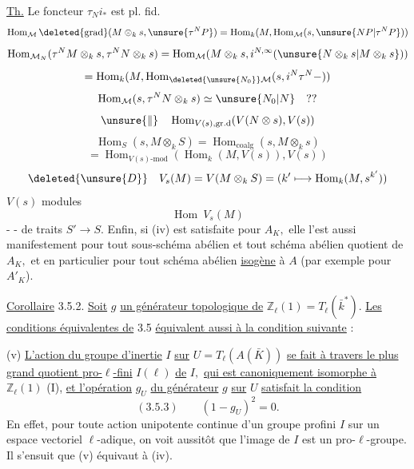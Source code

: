 \uline{Th.} Le foncteur \(\tau_N i_*\) est pl. fid.
\[
\operatorname{Hom}_{\mathcal M}\deleted{\text{grad}}(M\otimes_k s,\unsure{\tau^N P})=
\operatorname{Hom}_k(M,\operatorname{Hom}_{\mathcal M}(s,\unsure{NP|\tau^N P}))
\]
\[
\operatorname{Hom}_{\mathcal M_N}(\tau^N M\otimes_k s,\tau^N N\otimes_k s)=
\operatorname{Hom}_{\mathcal M}(M\otimes_k s,i^{N,\infty}(\unsure{N\otimes_k s|M\otimes_k s}))
\]
\[
=\operatorname{Hom}_k(M,\operatorname{Hom}_{\deleted{\unsure{N_0}}\mathcal M}(s,i^{N}\tau^N-))
\]
\[
\operatorname{Hom}_{\mathcal M}(s,\tau^N N\otimes_k s)\simeq\unsure{N_0|N}\quad??
\]
\[
\unsure{\Vert}\quad\operatorname{Hom}_{V(s),\mathrm{gr.d}}(V(N\otimes s),V(s))
\]
\[
\operatorname{Hom}_S(s,M\otimes_k S)=
\operatorname{Hom}_{\mathrm{coalg}}(s,M\otimes_k s)
\]
\[
=\operatorname{Hom}_{V(s)\text{-mod}}(\operatorname{Hom}_k(M,V(s)),V(s))
\]
\[
\deleted{\unsure{D}}\quad V_s(M)=V(M\otimes_k S)
=(k'\longmapsto\operatorname{Hom}_k(M,s^{k'}))
\]
\(V(s)\) modules
\[
\operatorname{Hom}\ V_s(M)
\]
-  -
de traits \(S'\longrightarrow S.\) Enfin, si (iv) est satisfaite pour \(A_K,\) elle l'est aussi manifestement pour tout sous-schéma abélien et tout schéma abélien quotient de \(A_K,\) et en particulier pour tout schéma abélien \uline{isogène} à \(A\) (par exemple pour \(A'_K\)).

\uline{Corollaire} 3.5.2. \uline{Soit} \(g\) \uline{un générateur topologique de} \(\mathbb Z_\ell(1)=T_\ell(\bar k^*).\) \uline{Les conditions équivalentes de} 3.5 \uline{équivalent aussi à la condition suivante} :

(v) \uline{L'action du groupe d'inertie} \(I\) \uline{sur} \(U=T_\ell(A(\bar K))\) \uline{se fait à travers le plus grand quotient pro-\(\ell\)-fini} \(I(\ell)\) \uline{de} \(I,\) \uline{qui est canoniquement isomorphe à} \(\mathbb Z_\ell(1)\) (I\qquad), \uline{et l'opération} \(g_U\) \uline{du générateur} \(g\) \uline{sur} \(U\) \uline{satisfait la condition}
\[
(3.5.3)\qquad(1-g_U)^2=0.
\]
En effet, pour toute action unipotente continue d'un groupe profini \(I\) sur un espace vectoriel \(\ell\)-adique, on voit aussitôt que l'image de \(I\) est un pro-\(\ell\)-groupe. Il s'ensuit que (v) équivaut à (iv).

